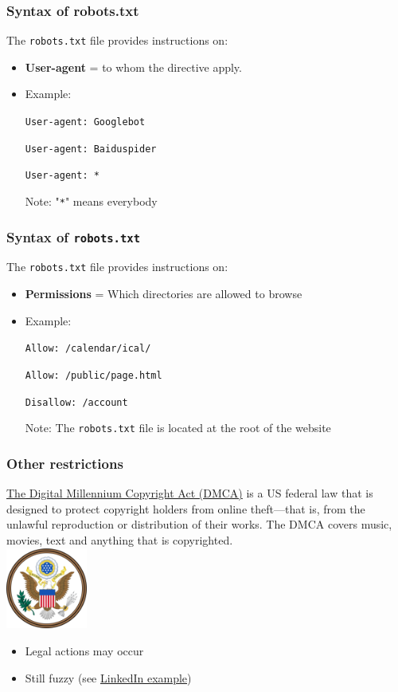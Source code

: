 \documentclass[xcolor=x11names,compress]{beamer}
\renewcommand{\(}{\begin{columns}}
\renewcommand{\)}{\end{columns}}
\newcommand{\<}[1]{\begin{column}{#1}}
\renewcommand{\>}{\end{column}}
\begin{document}
\begin{frame}
    \frametitle{Syntax of robots.txt}
The \texttt{robots.txt} file provides instructions on:
    \begin{itemize}[<+->]
        \item \textbf{User-agent} = to whom the directive apply.
        \item Example:
        \item[] \texttt{User-agent: Googlebot }
        \item[] \texttt{User-agent: Baiduspider }
        \item[] \texttt{User-agent: *}

        \item[Note:] "\texttt{*}" means everybody

    \end{itemize}
\end{frame}


\begin{frame}
    \frametitle{Syntax of \texttt{robots.txt}}
The \texttt{robots.txt} file provides instructions on:
    \begin{itemize}[<+->]
        \item \textbf{Permissions} = Which directories are allowed to browse
        \item Example:
        \item[] \texttt{Allow: /calendar/ical/}
        \item[] \texttt{Allow: /public/page.html}
        \item[] \texttt{Disallow: /account}
        \item[Note:] The \texttt{robots.txt} file is located at the root of the website
    \end{itemize}
\end{frame}


\begin{frame}
    \frametitle{Other restrictions}
    \begin{center}
\href{https://en.wikipedia.org/wiki/Digital_Millennium_Copyright_Act}{The Digital Millennium Copyright Act (DMCA)}  is a US federal law that is designed to protect copyright holders from online theft—that is, from the unlawful reproduction or distribution of their works. The DMCA covers music, movies, text and anything that is copyrighted. \\
  \includegraphics[width = 0.2\textwidth]{DMCA_logo.png}
    \end{center}

\pause
    \begin{itemize}[<+->]
        \item Legal actions may occur
        \item Still fuzzy (see \href{https://www.jdsupra.com/legalnews/data-scraping-deemed-legal-in-certain-5923866/}{LinkedIn example})
    \end{itemize}
\end{frame}
\end{document}
